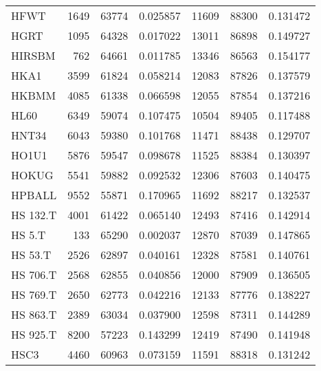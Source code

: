 \begin{tabular}{lrrrrrr}
                                 HFWT &      1649 &    63774 &  0.025857 &     11609 &    88300 &  0.131472 \\
                                 HGRT &      1095 &    64328 &  0.017022 &     13011 &    86898 &  0.149727 \\
                               HIRSBM &       762 &    64661 &  0.011785 &     13346 &    86563 &  0.154177 \\
                                 HKA1 &      3599 &    61824 &  0.058214 &     12083 &    87826 &  0.137579 \\
                                HKBMM &      4085 &    61338 &  0.066598 &     12055 &    87854 &  0.137216 \\
                                 HL60 &      6349 &    59074 &  0.107475 &     10504 &    89405 &  0.117488 \\
                                HNT34 &      6043 &    59380 &  0.101768 &     11471 &    88438 &  0.129707 \\
                                HO1U1 &      5876 &    59547 &  0.098678 &     11525 &    88384 &  0.130397 \\
                                HOKUG &      5541 &    59882 &  0.092532 &     12306 &    87603 &  0.140475 \\
                               HPBALL &      9552 &    55871 &  0.170965 &     11692 &    88217 &  0.132537 \\
                             HS 132.T &      4001 &    61422 &  0.065140 &     12493 &    87416 &  0.142914 \\
                               HS 5.T &       133 &    65290 &  0.002037 &     12870 &    87039 &  0.147865 \\
                              HS 53.T &      2526 &    62897 &  0.040161 &     12328 &    87581 &  0.140761 \\
                             HS 706.T &      2568 &    62855 &  0.040856 &     12000 &    87909 &  0.136505 \\
                             HS 769.T &      2650 &    62773 &  0.042216 &     12133 &    87776 &  0.138227 \\
                             HS 863.T &      2389 &    63034 &  0.037900 &     12598 &    87311 &  0.144289 \\
                             HS 925.T &      8200 &    57223 &  0.143299 &     12419 &    87490 &  0.141948 \\
                                 HSC3 &      4460 &    60963 &  0.073159 &     11591 &    88318 &  0.131242 \\

\end{tabular}
